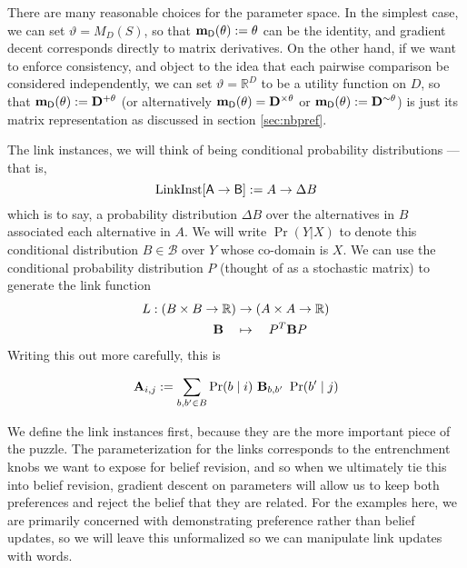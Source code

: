 \documentclass{article}
\begin{document}
 	There are many reasonable choices for the parameter space. In the simplest case, we can set $\vartheta = M_D(S)$, so that $\mathbf m_{\mathsf D}( \theta ) := \theta$ can be the identity, and gradient decent corresponds directly to matrix derivatives. On the other hand, if we want to enforce consistency, and object to the idea that each pairwise comparison be considered independently, we can set $\vartheta = \mathbb R^D$ to be a utility function on $D$, so that $\mathbf m_{\mathsf D}(\theta) := \mathbf D^{+\theta}$  (or alternatively $\mathbf m_{\mathsf D}(\theta) = \mathbf D^{\times\theta}$ or $\mathbf m_{\mathsf D}(\theta) := \mathbf D^{\sim\theta}$) is just its matrix representation as discussed in section \ref{sec:nbpref}.
 	
 			
 	The link instances, we will think of being conditional probability distributions --- that is,
	\[ \mathrm{LinkInst}[{\sf A \to B}] := A \to \Delta B \] 
	which is to say, a probability distribution $\Delta B$ over the alternatives in $B$ associated each alternative in $A$. We will write $\Pr(Y | X)$ to denote this conditional distribution $B \in \mathcal B$ over $Y$ whose co-domain is $X$. We can use the conditional probability distribution $P$ (thought of as a stochastic matrix) to generate the link function
	\begin{align*}
		L  : (B\times B \to \mathbb R) &\to (A \times A \to \mathbb R)\\
		\mathbf B \quad&\mapsto\quad P^T \mathbf B P 
	\end{align*}
	Writing this out more carefully, this is
	
	\[ \mathbf A_{i,j} := \sum_{b, b' \in B} \Pr(b \mid i )~\mathbf B_{b,b'}~\Pr(b' \mid j) \]
	
	We define the link instances first, because they are the more important piece of the puzzle. The parameterization for the links corresponds to the entrenchment knobs we want to expose for belief revision, and so when we ultimately tie this into belief revision, gradient descent on parameters will allow us to keep both preferences and reject the belief that they are related. For the examples here, we are primarily concerned with demonstrating preference rather than belief updates, so we will leave this unformalized so we can manipulate link updates with words.
	
\end{document}
